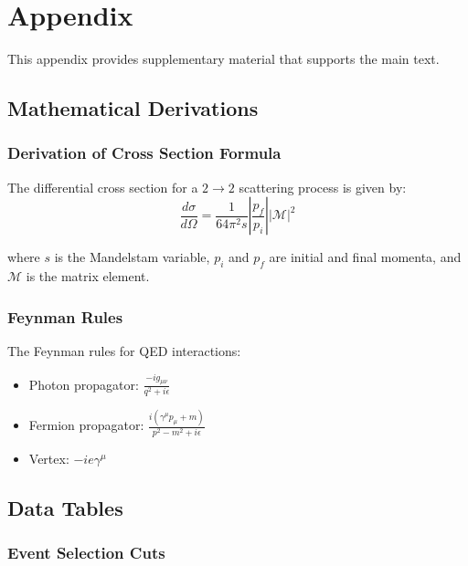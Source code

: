 \chapter{Appendix}
\label{ch:appendix}

This appendix provides supplementary material that supports the main text.

\section{Mathematical Derivations}

\subsection{Derivation of Cross Section Formula}

The differential cross section for a $2 \to 2$ scattering process is given by:
\begin{equation}
  \frac{d\sigma}{d\Omega} = \frac{1}{64\pi^2 s}\left|\frac{p_f}{p_i}\right||\mathcal{M}|^2
  \label{eq:cross-section-formula}
\end{equation}

where $s$ is the Mandelstam variable, $p_i$ and $p_f$ are initial and final momenta, and $\mathcal{M}$ is the matrix element.

\subsection{Feynman Rules}

The Feynman rules for QED interactions:
\begin{itemize}
  \item Photon propagator: $\frac{-ig_{\mu\nu}}{q^2 + i\epsilon}$
  \item Fermion propagator: $\frac{i(\gamma^\mu p_\mu + m)}{p^2 - m^2 + i\epsilon}$
  \item Vertex: $-ie\gamma^\mu$
\end{itemize}

\section{Data Tables}

\subsection{Event Selection Cuts}

